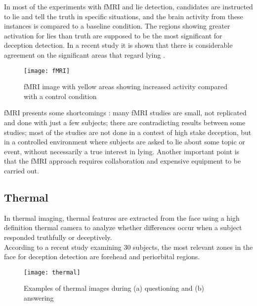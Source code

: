 In most of the experiments with fMRI and lie detection, candidates are instructed to lie and tell the truth in specific situations, and the brain activity from these instances is compared to a baseline condition. The regions showing greater activation for lies than truth are supposed to be the most significant for deception detection. In a recent study it is shown that there is considerable agreement on the significant areas that regard lying \cite{fMRILD}.\\
\begin{figure}[H]
	\centering
	\texttt{[image: fMRI]}
	\caption{fMRI image with yellow areas showing increased activity compared with a control condition  \cite{WikifMRI}}
\end{figure}
fMRI presents some shortcomings \cite{fMRIDD}\cite{fMRIDA}: many fMRI studies are small, not replicated and done with just a few subjects; there are contradicting results between some studies; most of the studies are not done in a contest of high stake deception, but in a controlled environment where subjects are asked to lie about some topic or event, without necessarily a true interest in lying. Another important point is that the fMRI approach requires collaboration and expensive equipment to be carried out.

\subsection*{Thermal}
In thermal imaging, thermal features are extracted from the face using a high definition thermal camera to analyze whether differences occur when a subject responded truthfully or deceptively. \\
According to a recent study \cite{Abouelenien:2015:TAD:2823465.2823470} examining 30 subjects, the most relevant zones in the face for deception detection are forehead and periorbital regions. 

\begin{figure}[H]
	\centering
	\texttt{[image: thermal]}
	\caption{Examples of thermal images during (a) questioning and (b) answering \cite{6967765}}
\end{figure}

